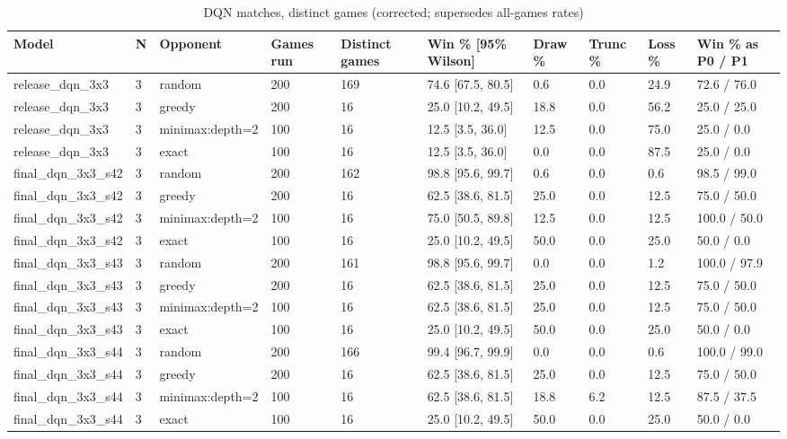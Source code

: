 \begin{table}[htbp]
\centering
\caption{DQN matches, distinct games (corrected; supersedes all-games rates)}
\label{tab:dqn_distinct}
\begin{tabular}{llllllllll}
\toprule
Model & N & Opponent & Games run & Distinct games & Win \% [95\% Wilson] & Draw \% & Trunc \% & Loss \% & Win \% as P0 / P1 \\
\midrule
release\_dqn\_3x3 & 3 & random & 200 & 169 & 74.6 [67.5, 80.5] & 0.6 & 0.0 & 24.9 & 72.6 / 76.0 \\
release\_dqn\_3x3 & 3 & greedy & 200 & 16 & 25.0 [10.2, 49.5] & 18.8 & 0.0 & 56.2 & 25.0 / 25.0 \\
release\_dqn\_3x3 & 3 & minimax:depth=2 & 100 & 16 & 12.5 [3.5, 36.0] & 12.5 & 0.0 & 75.0 & 25.0 / 0.0 \\
release\_dqn\_3x3 & 3 & exact & 100 & 16 & 12.5 [3.5, 36.0] & 0.0 & 0.0 & 87.5 & 25.0 / 0.0 \\
final\_dqn\_3x3\_s42 & 3 & random & 200 & 162 & 98.8 [95.6, 99.7] & 0.6 & 0.0 & 0.6 & 98.5 / 99.0 \\
final\_dqn\_3x3\_s42 & 3 & greedy & 200 & 16 & 62.5 [38.6, 81.5] & 25.0 & 0.0 & 12.5 & 75.0 / 50.0 \\
final\_dqn\_3x3\_s42 & 3 & minimax:depth=2 & 100 & 16 & 75.0 [50.5, 89.8] & 12.5 & 0.0 & 12.5 & 100.0 / 50.0 \\
final\_dqn\_3x3\_s42 & 3 & exact & 100 & 16 & 25.0 [10.2, 49.5] & 50.0 & 0.0 & 25.0 & 50.0 / 0.0 \\
final\_dqn\_3x3\_s43 & 3 & random & 200 & 161 & 98.8 [95.6, 99.7] & 0.0 & 0.0 & 1.2 & 100.0 / 97.9 \\
final\_dqn\_3x3\_s43 & 3 & greedy & 200 & 16 & 62.5 [38.6, 81.5] & 25.0 & 0.0 & 12.5 & 75.0 / 50.0 \\
final\_dqn\_3x3\_s43 & 3 & minimax:depth=2 & 100 & 16 & 62.5 [38.6, 81.5] & 25.0 & 0.0 & 12.5 & 75.0 / 50.0 \\
final\_dqn\_3x3\_s43 & 3 & exact & 100 & 16 & 25.0 [10.2, 49.5] & 50.0 & 0.0 & 25.0 & 50.0 / 0.0 \\
final\_dqn\_3x3\_s44 & 3 & random & 200 & 166 & 99.4 [96.7, 99.9] & 0.0 & 0.0 & 0.6 & 100.0 / 99.0 \\
final\_dqn\_3x3\_s44 & 3 & greedy & 200 & 16 & 62.5 [38.6, 81.5] & 25.0 & 0.0 & 12.5 & 75.0 / 50.0 \\
final\_dqn\_3x3\_s44 & 3 & minimax:depth=2 & 100 & 16 & 62.5 [38.6, 81.5] & 18.8 & 6.2 & 12.5 & 87.5 / 37.5 \\
final\_dqn\_3x3\_s44 & 3 & exact & 100 & 16 & 25.0 [10.2, 49.5] & 50.0 & 0.0 & 25.0 & 50.0 / 0.0 \\

\end{tabular}
\end{table}
